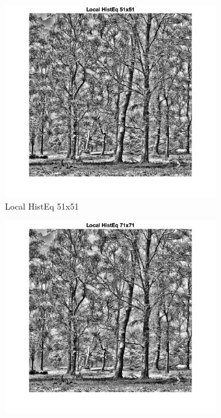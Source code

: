 \documentclass[12pt]{article}
\begin{document}
\begin{figure}[h!]
        \begin{subfigure}[b]{0.3\textwidth}
            \centering
            \includegraphics[width=\textwidth]{../images/LC2_localHistEq_51x51.png}
            \caption{Local HistEq 51x51}
        \end{subfigure}
        \hfill
        \begin{subfigure}[b]{0.3\textwidth}
            \centering
            \includegraphics[width=\textwidth]{../images/LC2_localHistEq_71x71.png}

\end{subfigure}
\end{figure}
\end{document}
